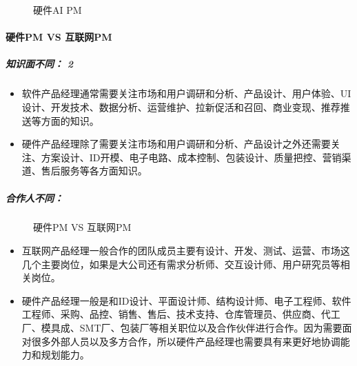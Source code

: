 \documentclass[letterpaper,11pt,english]{sphinxmanual}
\begin{document}
\begin{figure}[H]
\centering
\capstart

\noindent{}
\caption{硬件AI PM}\label{\detokenize{chapter_project/AI_hardware:id26}}\end{figure}


\paragraph{硬件PM VS 互联网PM}
\label{\detokenize{chapter_project/AI_hardware:pm-vs-pm}}

\subparagraph{知识面不同： 2\sphinxfootnotemark[267]}
\label{\detokenize{chapter_project/AI_hardware:id2}}%
\begin{footnotetext}[267]\sphinxAtStartFootnote
{}
%
\end{footnotetext}\ignorespaces \begin{itemize}
\item {} 
软件产品经理通常需要关注市场和用户调研和分析、产品设计、用户体验、UI设计、开发技术、数据分析、运营维护、拉新促活和召回、商业变现、推荐推送等方面的知识。

\item {} 
硬件产品经理除了需要关注市场和用户调研和分析、产品设计之外还需要关注、方案设计、ID开模、电子电路、成本控制、包装设计、质量把控、营销渠道、售后服务等各方面知识。

\end{itemize}


\subparagraph{合作人不同：}
\label{\detokenize{chapter_project/AI_hardware:id3}}
\begin{figure}[H]
\centering
\capstart

\noindent{}
\caption{硬件PM VS 互联网PM}\label{\detokenize{chapter_project/AI_hardware:id27}}\end{figure}
\begin{itemize}
\item {} 
互联网产品经理一般合作的团队成员主要有设计、开发、测试、运营、市场这几个主要岗位，如果是大公司还有需求分析师、交互设计师、用户研究员等相关岗位。

\item {} 
硬件产品经理一般是和ID设计、平面设计师、结构设计师、电子工程师、软件工程师、采购、品控、销售、售后、技术支持、仓库管理员、供应商、代工厂、模具成、SMT厂、包装厂等相关职位以及合作伙伴进行合作。因为需要面对很多外部人员以及多方合作，所以硬件产品经理也需要具有来更好地协调能力和规划能力。

\end{itemize}
\end{document}
